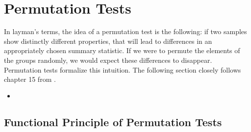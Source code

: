 \documentclass[12pt, a4paper]{article}
\theoremstyle{MAstyle} \newtheorem{assumption}{Assumption}[section]
\theoremstyle{MAstyle} \newtheorem{definition}{Definition}[section]
\theoremstyle{MAstyle} \newtheorem{theorem}{Theorem}[section]
\begin{document}
	\section{Permutation Tests}\label{Permutation_Tests}
		In layman's terms, the idea of a permutation test is the following: if two samples show distinctly different properties, that will lead to differences in an appropriately chosen summary statistic. If we were to permute the elements of the groups randomly, we would expect these differences to disappear.
		Permutation tests formalize this intuition. The following section closely follows chapter 15 from \cite{lehmann_testing_2005}.
		
		\begin{itemize}
			\item \cite{van_der_vaart_weak_1996}
		\end{itemize}
	
		\subsection{Functional Principle of Permutation Tests}
		
\end{document}
